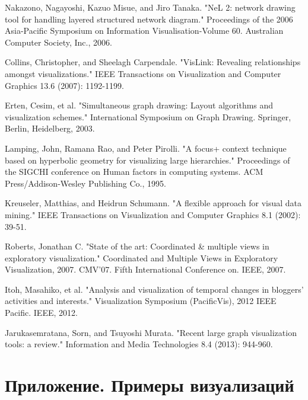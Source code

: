 \begin{thebibliography}{99}
 Nakazono, Nagayoshi, Kazuo Misue, and Jiro Tanaka. "NeL 2: network drawing tool for handling layered structured network diagram." Proceedings of the 2006 Asia-Pacific Symposium on Information Visualisation-Volume 60. Australian Computer Society, Inc., 2006.

 Collins, Christopher, and Sheelagh Carpendale. "VisLink: Revealing relationships amongst visualizations." IEEE Transactions on Visualization and Computer Graphics 13.6 (2007): 1192-1199.

 Erten, Cesim, et al. "Simultaneous graph drawing: Layout algorithms and visualization schemes." International Symposium on Graph Drawing. Springer, Berlin, Heidelberg, 2003.

 Lamping, John, Ramana Rao, and Peter Pirolli. "A focus+ context technique based on hyperbolic geometry for visualizing large hierarchies." Proceedings of the SIGCHI conference on Human factors in computing systems. ACM Press/Addison-Wesley Publishing Co., 1995.

 Kreuseler, Matthias, and Heidrun Schumann. "A flexible approach for visual data mining." IEEE Transactions on Visualization and Computer Graphics 8.1 (2002): 39-51.

 Roberts, Jonathan C. "State of the art: Coordinated \& multiple views in exploratory visualization." Coordinated and Multiple Views in Exploratory Visualization, 2007. CMV'07. Fifth International Conference on. IEEE, 2007.

 Itoh, Masahiko, et al. "Analysis and visualization of temporal changes in bloggers' activities and interests." Visualization Symposium (PacificVis), 2012 IEEE Pacific. IEEE, 2012.

 Jarukasemratana, Sorn, and Tsuyoshi Murata. "Recent large graph visualization tools: a review." Information and Media Technologies 8.4 (2013): 944-960.

\end{thebibliography}



\chapter{Приложение. Примеры визуализаций}

